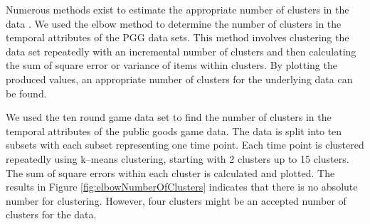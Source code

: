  Numerous methods exist to estimate the appropriate number of clusters in the data \cite{Milligan1985, Yu2014}. We used the elbow method \cite{Ketchen} to determine the number of clusters in the temporal attributes of the PGG data sets. This method involves clustering the data set repeatedly with an incremental number of clusters and then calculating the sum of square error or variance of items within clusters. By plotting the produced values, an appropriate number of clusters for the underlying data can be found.
 
 We used the ten round game data set to find the number of clusters in the temporal attributes of the public goods game data. The data is split into ten subsets with each subset representing one time point. Each time point is clustered repeatedly using k--means clustering, starting with 2 clusters up to 15 clusters. The sum of square errors within each cluster is calculated and plotted. The results in Figure \ref{fig:elbowNumberOfClusters} indicates that there is no absolute number for clustering. However, four clusters might be an accepted number of clusters for the data. 
 
